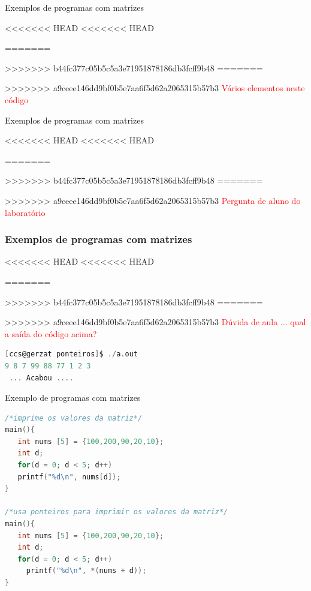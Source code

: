 \begin{frame}{Exemplos de programas com matrizes}


<<<<<<< HEAD
<<<<<<< HEAD

=======

>>>>>>> b44fc377c05b5c5a3e71951878186db3fcff9b48
=======

>>>>>>> a9ceee146dd9bf0b5e7aa6f5d62a2065315b57b3
\pause
\textcolor{red}{Vários elementos neste código}

\end{frame}


\begin{frame}{Exemplos de programas com matrizes}


<<<<<<< HEAD
<<<<<<< HEAD

=======

>>>>>>> b44fc377c05b5c5a3e71951878186db3fcff9b48
=======

>>>>>>> a9ceee146dd9bf0b5e7aa6f5d62a2065315b57b3
\pause
\textcolor{red}{Pergunta de aluno do  laboratório}

\end{frame}



\begin{frame}

\frametitle{Exemplos de programas com matrizes}

<<<<<<< HEAD
<<<<<<< HEAD

=======

>>>>>>> b44fc377c05b5c5a3e71951878186db3fcff9b48
=======

>>>>>>> a9ceee146dd9bf0b5e7aa6f5d62a2065315b57b3
\textcolor{red}{Dúvida de aula ... qual a saída do código acima?}

\pause

\begin{lstlisting}[language=C]
[ccs@gerzat ponteiros]$ ./a.out 
9 8 7 99 88 77 1 2 3 
 ... Acabou ....
\end{lstlisting}

\end{frame}





\begin{frame}{Exemplo de programas com matrizes}
\begin{lstlisting}[language=C]
/*imprime os valores da matriz*/
main(){
   int nums [5] = {100,200,90,20,10};
   int d;
   for(d = 0; d < 5; d++)
   printf("%d\n", nums[d]);
}

/*usa ponteiros para imprimir os valores da matriz*/
main(){
   int nums [5] = {100,200,90,20,10};
   int d;
   for(d = 0; d < 5; d++)
     printf("%d\n", *(nums + d));
}
\end{lstlisting}
\end{frame}

